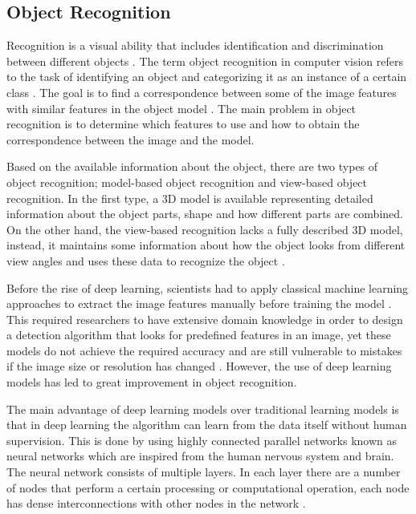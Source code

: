 \documentclass[12pt,twocolumn,a4paper]{article}
\begin{document}
    \subsection{Object Recognition}
    \hspace{0.3cm} Recognition is a visual ability that includes identification and discrimination between different objects \cite{Liter1998-bk}. The term object recognition in computer vision refers to the task of identifying an object and categorizing it as an instance of a certain class \cite{Liter1998-bk}. The goal is to find a correspondence between some of the image features with similar features in the object model \cite{Mutihac2005PARADIGMSIO}. The main problem in object recognition is to determine which features to use and how to obtain the correspondence between the image and the model.

    Based on the available information about the object, there are two types of object recognition; model-based object recognition and view-based object recognition. In the first type, a 3D model is available representing detailed information about the object parts, shape and how different parts are combined. On the other hand, the view-based recognition lacks a fully described 3D model, instead, it maintains some information about how the object looks from different view angles and uses these data to recognize the object \cite{Mutihac2005PARADIGMSIO}.

    Before the rise of deep learning, scientists had to apply classical machine learning approaches to extract the image features manually before training the model \cite{Varadarajan2021-po}. This required researchers to have extensive domain knowledge in order to design a detection algorithm that looks for predefined features in an image, yet these models do not achieve the required accuracy and are still vulnerable to mistakes if the image size or resolution has changed \cite{Goyal2014-xk}. However, the use of deep learning models has led to great improvement in object recognition.

    The main advantage of deep learning models over traditional learning models is that in deep learning the algorithm can learn from the data itself without human supervision. This is done by using highly connected parallel networks known as neural networks which are inspired from the human nervous system and brain. The neural network consists of multiple layers. In each layer there are a number of nodes that perform a certain processing or computational operation, each node has dense interconnections with other nodes in the network \cite{Mutihac2005PARADIGMSIO}.
\end{document}
